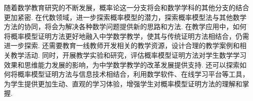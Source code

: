 
随着数学教育研究的不断发展，概率论这一分支将会和数学学科的其他分支的结合更加紧密. 在代数领域，进一步探索概率模型的潜力，探索概率模型法与其他数学方法的协同，将会为解决各种数学问题提供新的思路和方法. 在教学应用中，如何将概率模型证明方法更好地融入中学数学教学，使其与传统证明方法相结合，仍需进一步探索. 还需要教育一线教师开发相关的教学资源，设计合理的教学案例和相关教学活动. 同时，开展教学实验和研究，评估概率模型证明方法对学生数学学习效果和思维能力发展的影响，为中学数学教学的改革发展提供支持. 还可以探索如何将概率模型证明方法与信息技术相结合，利用数学软件、在线学习平台等工具，为学生提供更加生动、直观的学习体验，增强学生对概率模型证明方法的理解和掌握. 

